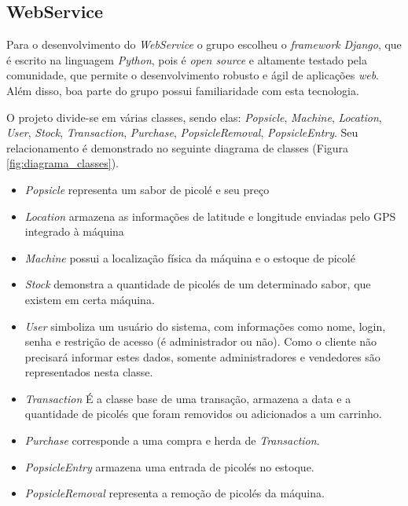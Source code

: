 \subsection{WebService}
Para o desenvolvimento do \textit{WebService} o grupo escolheu o \textit{framework} \textit{Django}, que é escrito na linguagem \textit{Python}, pois é \textit{open source} e altamente testado pela comunidade, que permite o desenvolvimento robusto e ágil de aplicações \textit{web}. Além disso, boa parte do grupo possui familiaridade com esta tecnologia.

O projeto divide-se em várias classes, sendo elas: \textit{Popsicle}, \textit{Machine}, \textit{Location}, \textit{User}, \textit{Stock}, \textit{Transaction}, \textit{Purchase}, \textit{PopsicleRemoval}, \textit{PopsicleEntry}. Seu relacionamento é demonstrado no seguinte diagrama de classes (Figura \ref{fig:diagrama_classes}).


\begin{itemize}
\item \textit{Popsicle} representa um sabor de picolé e seu preço
\item \textit{Location} armazena as informações de latitude e longitude enviadas pelo GPS integrado à máquina
\item \textit{Machine} possui a localização física da máquina e o estoque de picolé
\item \textit{Stock} demonstra a quantidade de picolés de um determinado sabor, que existem em certa máquina.
\item \textit{User} simboliza um usuário do sistema, com informações como nome, login, senha e restrição de acesso (é administrador ou não). Como o cliente não precisará informar estes dados, somente administradores e vendedores são representados nesta classe.
\item \textit{Transaction} É a classe base de uma transação, armazena a data e a quantidade de picolés que foram removidos ou adicionados a um carrinho.
\item \textit{Purchase} corresponde a uma compra e herda de \textit{Transaction}.
\item \textit{PopsicleEntry} armazena uma entrada de picolés no estoque.
\item \textit{PopsicleRemoval} representa a remoção de picolés da máquina.
\end{itemize}

